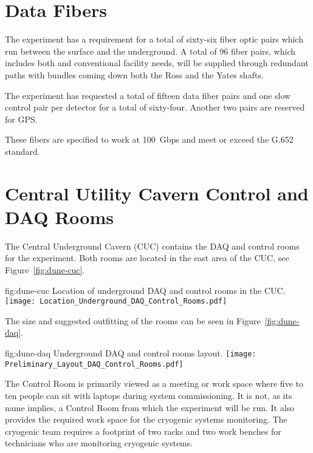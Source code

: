 \section{Data Fibers}
\label{sec:fdsp-coord-faci-fibers}


The  experiment has a requirement for a total of sixty-six fiber
optic pairs which run between the surface and the underground.  A
total of 96 fiber pairs, which includes both  and conventional
facility needs, will be supplied through redundant paths with bundles
coming down both the Ross and the Yates shafts.


The experiment has requested a total of fifteen data fiber pairs and
one slow control pair per detector for a total of sixty-four.  Another
two pairs are reserved for GPS.


These fibers are specified to work at 100~Gbps and meet or exceed the
G.652 standard.


\section{Central Utility Cavern Control and DAQ Rooms}
\label{sec:fdsp-coord-cuc-daq}


The Central Underground Cavern (CUC) contains the DAQ and control
rooms for the  experiment.  Both rooms are located in the east
area of the CUC, see Figure~\ref{fig:dune-cuc}.  
\begin{dunefigure}{fig:dune-cuc}
  {Location of underground DAQ and control rooms in the CUC.}
  \texttt{[image: Location\_Underground\_DAQ\_Control\_Rooms.pdf]}
\end{dunefigure}
The size and suggested outfitting of the rooms can be seen in
Figure~\ref{fig:dune-daq}.
\begin{dunefigure}{fig:dune-daq}
  {Underground DAQ and control rooms layout.}
  \texttt{[image: Preliminary\_Layout\_DAQ\_Control\_Rooms.pdf]}
\end{dunefigure}


The Control Room is primarily viewed as a meeting or work space where
five to ten people can sit with laptops during system commissioning.
It is not, as its name implies, a Control Room from which the
experiment will be run.  It also provides the required work space for
the cryogenic systems monitoring.  The cryogenic team requires a
footprint of two racks and two work benches for technicians who are
monitoring cryogenic systems.
       
